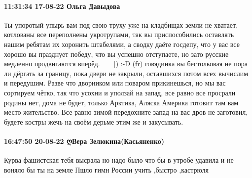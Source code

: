  
 
 
 
 

\paragraph{11:31:34 17-08-22 Ольга Давыдова}

Ты упоротый упырь вам под свою труху уже на кладбищах земли не хватает,
котлованы все переполнены укротрупами, так вы приспособились оставлять нашим
ребятам их хоронить штабелями, а сводку даёте госдепу, что у вас все хорошо вы
празднует победу, что вы успешно отступаете, но зато русские медленно
продвигаются вперёд. 🤣🤣🤣😜😜😜|) :-D (fr) говядинка вы бестолковая не пора
ли дёргать за границу, пока двери не закрыли, оставшихся потом всех вычислим и
передушим. Разве что дворником или поваром прикинешься, но мы вас сортируем
чётко, так что усохни и уползай на запад, все равно все просрали родины нет,
дома не будет, только Арктика, Аляска Америка готовит там вам место жительство.
Все равно зимой передохните запад на вас дров не заготовил, будете костры жечь
на своём дерьме этим же и закусывать.

\paragraph{16:47:50 20-08-22 ღВера Зелюкина(Касьяненко)}

Курва фашистская тебя высрала но надо было что бы в утробе удавила и не воняло
бы ты на земле Пшло гимн России учить ,быстро ,кастрюля


